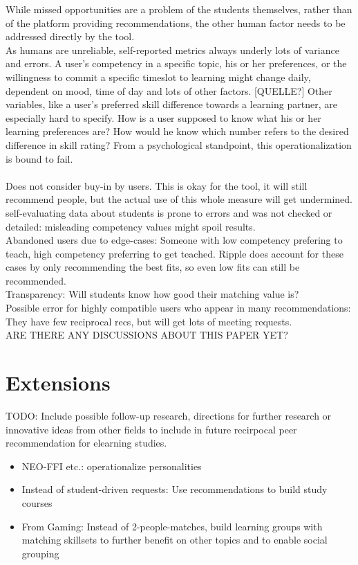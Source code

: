 \documentclass[nochapterpage,bigchapter,linedtoc,longdoc,colorback,accentcolor=tud3b]{tudreport}
\begin{document}
While missed opportunities are a problem of the students themselves, rather than of the platform providing recommendations, the other human factor needs to be addressed directly by the tool.\\
As humans are unreliable, self-reported metrics always underly lots of variance and errors. A user's competency in a specific topic, his or her preferences, or the willingness to commit a specific timeslot to learning might change daily, dependent on mood, time of day and lots of other factors. [QUELLE?] Other variables, like a user's preferred skill difference towards a learning partner, are especially hard to specify. How is a user supposed to know what his or her learning preferences are? How would he know which number refers to the desired difference in skill rating? From a psychological standpoint, this operationalization is bound to fail.\\
\\
Does not consider buy-in by users. This is okay for the tool, it will still recommend people, but the actual use of this whole measure will get undermined.\\
self-evaluating data about students is prone to errors and was not checked or detailed: misleading competency values might spoil results.\\
Abandoned users due to edge-cases: Someone with low competency prefering to teach, high competency preferring to get teached. Ripple does account for these cases by only recommending the best fits, so even low fits can still be recommended.\\
Transparency: Will students know how good their matching value is?\\
Possible error for highly compatible users who appear in many recommendations: They have few reciprocal recs, but will get lots of meeting requests.\\
ARE THERE ANY DISCUSSIONS ABOUT THIS PAPER YET?\\


\chapter{Extensions}
TODO: Include possible follow-up research, directions for further research or innovative ideas from other fields to include in future recirpocal peer recommendation for elearning studies.\\
\begin{itemize}
	\item NEO-FFI etc.: operationalize personalities
	\item Instead of student-driven requests: Use recommendations to build study courses
	\item From Gaming: Instead of 2-people-matches, build learning groups with matching skillsets to further benefit on other topics and to enable social grouping\\
\end{itemize}




\end{document}
